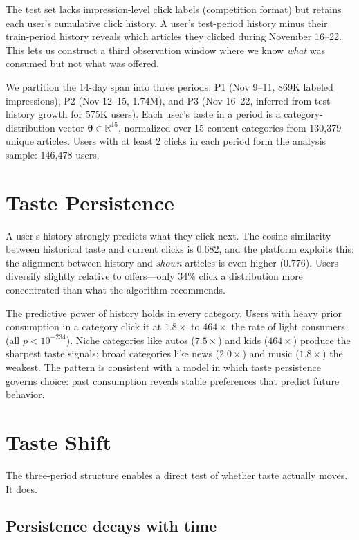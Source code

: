 \documentclass[11pt]{article}
\begin{document}
The test set lacks impression-level click labels (competition format) but retains each user's cumulative click history. A user's test-period history minus their train-period history reveals which articles they clicked during November 16--22. This lets us construct a third observation window where we know \emph{what} was consumed but not what was offered.

We partition the 14-day span into three periods: P1 (Nov 9--11, 869K labeled impressions), P2 (Nov 12--15, 1.74M), and P3 (Nov 16--22, inferred from test history growth for 575K users). Each user's taste in a period is a category-distribution vector $\boldsymbol{\theta} \in \mathbb{R}^{15}$, normalized over 15 content categories from 130,379 unique articles. Users with at least 2 clicks in each period form the analysis sample: 146,478 users.

\section{Taste Persistence}

A user's history strongly predicts what they click next. The cosine similarity between historical taste and current clicks is $0.682$, and the platform exploits this: the alignment between history and \emph{shown} articles is even higher ($0.776$). Users diversify slightly relative to offers---only 34\% click a distribution more concentrated than what the algorithm recommends.

The predictive power of history holds in every category. Users with heavy prior consumption in a category click it at $1.8\times$ to $464\times$ the rate of light consumers (all $p < 10^{-234}$). Niche categories like autos ($7.5\times$) and kids ($464\times$) produce the sharpest taste signals; broad categories like news ($2.0\times$) and music ($1.8\times$) the weakest. The pattern is consistent with a model in which taste persistence governs choice: past consumption reveals stable preferences that predict future behavior.

\section{Taste Shift}
\label{sec:shift}

The three-period structure enables a direct test of whether taste actually moves. It does.

\subsection*{Persistence decays with time}
\end{document}
